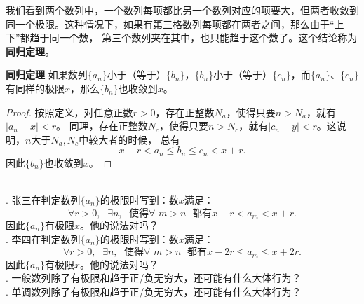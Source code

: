 \documentclass[12pt,UTF8,fontset=none]{ctexbook}
\begin{document}
我们看到两个数列中，一个数列每项都比另一个数列对应的项要大，但两者收敛到同一个极限。这种情况下，如果有第三格数列每项都在两者之间，那么由于“上下”都趋于同一个数，
第三个数列夹在其中，也只能趋于这个数了。这个结论称为\textbf{同归定理}。
\begin{tm}{\textbf{同归定理}}\label{tm:a-0-48}
    如果数列$\{a_n\}$小于（等于）$\{b_n\}$，$\{b_n\}$小于（等于）$\{c_n\}$，而$\{a_n\}$、$\{c_n\}$有同样的极限$x$，那么$\{b_n\}$也收敛到$x$。
\end{tm}
\begin{proof}
    按照定义，对任意正数$r>0$，存在正整数$N_a$，使得只要$n>N_a$，就有$|a_n - x| < r$。
    同理，存在正整数$N_c$，使得只要$n>N_c$，就有$|c_n - y| < r$。这说明，$n$大于$N_a,N_c$中较大者的时候，
    总有
    $$ x - r < a_n \leqslant b_n \leqslant c_n < x + r. $$
    因此$\{b_n\}$也收敛到$x$。
\end{proof}

\begin{sk}
    \mbox{} \\
    . 张三在判定数列$\{a_n\}$的极限时写到：数$x$满足：
    $$ \forall r > 0, \;\,\, \exists n,  \;\,\, \mbox{使得} \forall \,\, m > n \;\,\, \mbox{都有} x - r < a_m < x + r. $$
    \indent 因此$\{a_n\}$有极限$x$。他的说法对吗？\\
    . 李四在判定数列$\{a_n\}$的极限时写到：数$x$满足：
    $$ \forall r > 0, \;\,\, \exists n,  \;\,\, \mbox{使得} \forall \,\, m > n \;\,\, \mbox{都有} x - 2r \leqslant a_m \leqslant x + 2r. $$
    \indent 因此$\{a_n\}$有极限$x$。他的说法对吗？\\
    . 一般数列除了有极限和趋于正/负无穷大，还可能有什么大体行为？\\
    . 单调数列除了有极限和趋于正/负无穷大，还可能有什么大体行为？
\end{sk}
\end{document}
